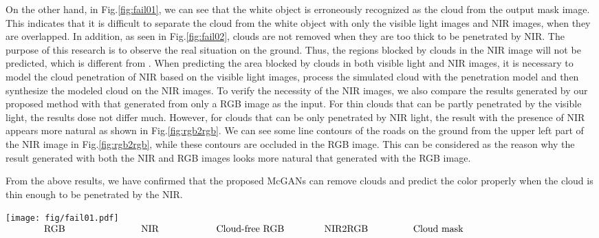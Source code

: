 \documentclass[10pt,twocolumn,letterpaper]{article}
\begin{document}
On the other hand, in Fig.\ref{fig:fail01}, we can see that the white object is erroneously recognized as the cloud from the output mask image. This indicates that it is difficult to separate the cloud from the white object with only the visible light images and NIR images, when they are overlapped.
In addition, as seen in Fig.\ref{fig:fail02}, clouds are not removed when they are too thick to be penetrated by NIR. The purpose of this research is to observe the real situation on the ground. Thus, the regions blocked by clouds in the NIR image will not be predicted, which is different from \cite {pathak2016context}. 
When predicting the area blocked by clouds in both visible light and NIR images, it is necessary to model the cloud penetration of NIR based on the visible light images, process the simulated cloud with the penetration model and then synthesize the modeled cloud on the NIR images.
To verify the necessity of the NIR images, we also compare the results generated by our proposed method with that generated from only a RGB image as the input. For thin clouds that can be partly penetrated by the visible light, the results dose not differ much. However, for clouds that can be only penetrated by NIR light, the result with the presence of NIR appears more natural as shown in Fig.\ref{fig:rgb2rgb}. We can see some line contours of the roads on the ground from the upper left part of the NIR image in Fig.\ref{fig:rgb2rgb}, while these contours are occluded in the RGB image. This can be considered as the reason why the result generated with both the NIR and RGB images looks more natural that generated with the RGB image.


From the above results, we have confirmed that the proposed McGANs can remove clouds and predict the color properly when the cloud is thin enough to be penetrated by the NIR.






\begin{figure*}[thb]
\begin{center}
\hspace*{0mm}\texttt{[image: fig/fail01.pdf]}
\vspace{-2mm}
$\begin{array}{p{32mm}p{32mm}p{32mm}p{32mm}p{32mm}}
 \hspace*{12mm}\raisebox{1mm}{RGB}
&\hspace*{12mm}\raisebox{1mm}{NIR}
&\hspace*{4mm}\raisebox{1mm}{Cloud-free RGB}
&\hspace*{8mm}\raisebox{1mm}{NIR2RGB}
&\hspace*{5mm}\raisebox{1mm}{Cloud mask}
\end{array}$
\caption{Failure case due to a white object}
\label{fig:fail01}
\end{center}
\end{figure*}
\end{document}
